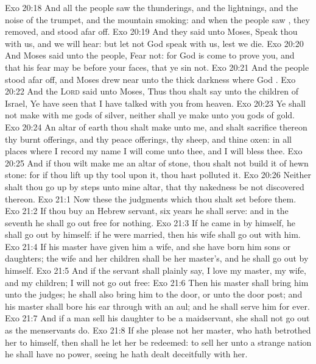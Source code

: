 \vs Exo 20:18 And all the people saw the thunderings, and the lightnings, and the noise of the trumpet, and the mountain smoking: and when the people saw , they removed, and stood afar off.
\vs Exo 20:19 And they said unto Moses, Speak thou with us, and we will hear: but let not God speak with us, lest we die.
\vs Exo 20:20 And Moses said unto the people, Fear not: for God is come to prove you, and that his fear may be before your faces, that ye sin not.
\vs Exo 20:21 And the people stood afar off, and Moses drew near unto the thick darkness where God .
\vs Exo 20:22 And the \textsc{Lord} said unto Moses, Thus thou shalt say unto the children of Israel, Ye have seen that I have talked with you from heaven.
\vs Exo 20:23 Ye shall not make with me gods of silver, neither shall ye make unto you gods of gold.
\vs Exo 20:24 An altar of earth thou shalt make unto me, and shalt sacrifice thereon thy burnt offerings, and thy peace offerings, thy sheep, and thine oxen: in all places where I record my name I will come unto thee, and I will bless thee.
\vs Exo 20:25 And if thou wilt make me an altar of stone, thou shalt not build it of hewn stone: for if thou lift up thy tool upon it, thou hast polluted it.
\vs Exo 20:26 Neither shalt thou go up by steps unto mine altar, that thy nakedness be not discovered thereon.
\vs Exo 21:1 Now these  the judgments which thou shalt set before them.
\vs Exo 21:2 If thou buy an Hebrew servant, six years he shall serve: and in the seventh he shall go out free for nothing.
\vs Exo 21:3 If he came in by himself, he shall go out by himself: if he were married, then his wife shall go out with him.
\vs Exo 21:4 If his master have given him a wife, and she have born him sons or daughters; the wife and her children shall be her master's, and he shall go out by himself.
\vs Exo 21:5 And if the servant shall plainly say, I love my master, my wife, and my children; I will not go out free:
\vs Exo 21:6 Then his master shall bring him unto the judges; he shall also bring him to the door, or unto the door post; and his master shall bore his ear through with an aul; and he shall serve him for ever.
\vs Exo 21:7 And if a man sell his daughter to be a maidservant, she shall not go out as the menservants do.
\vs Exo 21:8 If she please not her master, who hath betrothed her to himself, then shall he let her be redeemed: to sell her unto a strange nation he shall have no power, seeing he hath dealt deceitfully with her.
